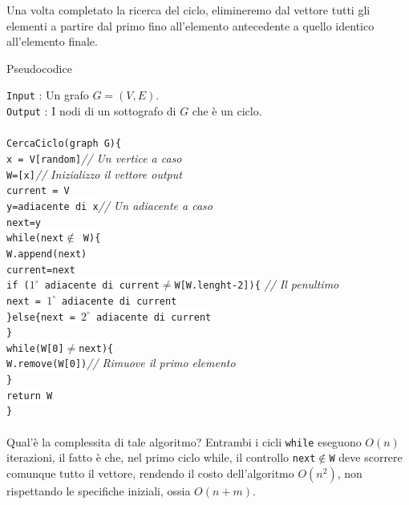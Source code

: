 \documentclass[12pt, letterpaper]{article}
\newcommand{\code}[1]{\colorbox{light-gray}{\texttt{#1}}}
\newcommand{\codee}[1]{\colorbox{white}{\texttt{#1}}}
\newcommand{\acc}{\\\hphantom{}\\}
\begin{document}
Una volta completato la ricerca del ciclo, elimineremo dal vettore tutti gli elementi a partire dal primo 
fino all'elemento antecedente a quello identico all'elemento finale. \begin{center}
    Pseudocodice 
\end{center}
\code{Input} : Un grafo $G=(V,E)$.\\
\code{Output} : I nodi di un sottografo di \(G\) che è un ciclo.\\\hphantom{}\\
\codee{CercaCiclo(graph G)\{}\\
\hphantom{ident}\codee{x = V[random]}\color{lg}\textit{// Un vertice a caso}\color{black}\\
\hphantom{ident}\codee{W=[x]}\color{lg}\textit{// Inizializzo il vettore output}\color{black}\\
\hphantom{ident}\codee{current = V}\\
\hphantom{ident}\codee{y=adiacente di x}\color{lg}\textit{// Un adiacente a caso}\color{black}\\
\hphantom{ident}\codee{next=y}\\
\hphantom{ident}\codee{while(next$\notin$ W)\{}\\
\hphantom{ident}\hphantom{ident}\codee{W.append(next)}\\
\hphantom{ident}\hphantom{ident}\codee{current=next}\\
\hphantom{ident}\hphantom{ident}\codee{if ($1^\circ$ adiacente di current$\ne$W[W.lenght-2])\{}
\color{lg}\textit{// Il penultimo}\color{black}\\
\hphantom{ident}\hphantom{ident}\hphantom{ident}\codee{next = $1^\circ$ adiacente di current}\\
\hphantom{ident}\hphantom{ident}\codee{\}else\{next = $2^\circ$ adiacente di current}\\
\hphantom{ident}\codee{\}}\\
\hphantom{ident}\codee{while(W[0]$\ne$next)\{}\\
\hphantom{ident}\hphantom{ident}\codee{W.remove(W[0])}\color{lg}\textit{// Rimuove il primo elemento}\color{black}\\
\hphantom{ident}\codee{\}}\\
\hphantom{ident}\codee{return W}\\
\codee{\}}\acc 
Qual'è la complessita di tale algoritmo? Entrambi i cicli \code{while} eseguono \(O(n)\) iterazioni, il 
fatto è che, nel primo ciclo while, il controllo \code{next$\notin$W} deve scorrere comunque tutto il vettore, 
rendendo il costo dell'algoritmo \(O(n^2)\), non rispettando le specifiche iniziali, ossia \(O(n+m)\).
\end{document}
